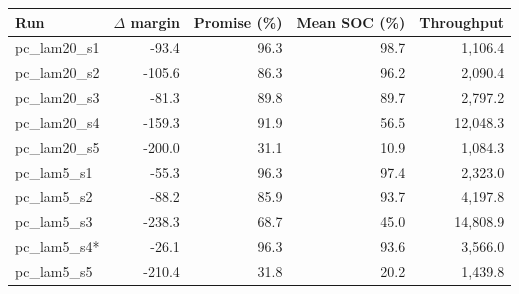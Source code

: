 \begin{tabular}{lrrrr}
\toprule
Run & $\Delta$ margin & Promise (\%) & Mean SOC (\%) & Throughput \\
\midrule
pc\_lam20\_s1 & -93.4 & 96.3 & 98.7 & 1,106.4 \\
pc\_lam20\_s2 & -105.6 & 86.3 & 96.2 & 2,090.4 \\
pc\_lam20\_s3 & -81.3 & 89.8 & 89.7 & 2,797.2 \\
pc\_lam20\_s4 & -159.3 & 91.9 & 56.5 & 12,048.3 \\
pc\_lam20\_s5 & -200.0 & 31.1 & 10.9 & 1,084.3 \\
pc\_lam5\_s1 & -55.3 & 96.3 & 97.4 & 2,323.0 \\
pc\_lam5\_s2 & -88.2 & 85.9 & 93.7 & 4,197.8 \\
pc\_lam5\_s3 & -238.3 & 68.7 & 45.0 & 14,808.9 \\
pc\_lam5\_s4* & -26.1 & 96.3 & 93.6 & 3,566.0 \\
pc\_lam5\_s5 & -210.4 & 31.8 & 20.2 & 1,439.8 \\
\bottomrule
\end{tabular}
